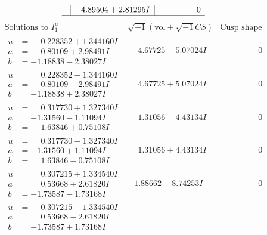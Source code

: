 \documentclass[1p]{elsarticle_modified}
\theoremstyle{definition}
\newcommand{\I}{\sqrt{-1}}
\begin{document}
$$\begin{array}{c|c|c}
 & \phantom{-}4.89504 + 2.81295 I & \phantom{-0.000000 } 0\\
 \hline 
 \end{array}$$\newpage$$\begin{array}{c|c|c}  
\text{Solutions to }I^u_{1}& \I (\text{vol} + \sqrt{-1}CS) & \text{Cusp shape}\\
 \hline 
\begin{aligned}
u &= \phantom{-}0.228352 + 1.344160 I \\
a &= \phantom{-}0.80109 + 2.98491 I \\
b &= -1.18838 - 2.38027 I\end{aligned}
 & \phantom{-}4.67725 - 5.07024 I & \phantom{-0.000000 } 0 \\ \hline\begin{aligned}
u &= \phantom{-}0.228352 - 1.344160 I \\
a &= \phantom{-}0.80109 - 2.98491 I \\
b &= -1.18838 + 2.38027 I\end{aligned}
 & \phantom{-}4.67725 + 5.07024 I & \phantom{-0.000000 } 0 \\ \hline\begin{aligned}
u &= \phantom{-}0.317730 + 1.327340 I \\
a &= -1.31560 - 1.11094 I \\
b &= \phantom{-}1.63846 + 0.75108 I\end{aligned}
 & \phantom{-}1.31056 - 4.43134 I & \phantom{-0.000000 } 0 \\ \hline\begin{aligned}
u &= \phantom{-}0.317730 - 1.327340 I \\
a &= -1.31560 + 1.11094 I \\
b &= \phantom{-}1.63846 - 0.75108 I\end{aligned}
 & \phantom{-}1.31056 + 4.43134 I & \phantom{-0.000000 } 0 \\ \hline\begin{aligned}
u &= \phantom{-}0.307215 + 1.334540 I \\
a &= \phantom{-}0.53668 + 2.61820 I \\
b &= -1.73587 - 1.73168 I\end{aligned}
 & -1.88662 - 8.74253 I & \phantom{-0.000000 } 0 \\ \hline\begin{aligned}
u &= \phantom{-}0.307215 - 1.334540 I \\
a &= \phantom{-}0.53668 - 2.61820 I \\
b &= -1.73587 + 1.73168 I\end{aligned}

\end{array}$$
\end{document}
